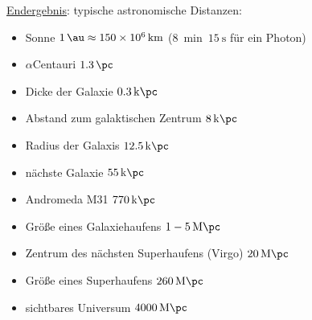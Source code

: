 \underline{Endergebnis}: typische astronomische Distanzen:
\begin{itemize}[label={}]
	\item Sonne $\SI{1}{\au}\approx \SI{150e6}{\km}$ ($\SI{8}{\min}\ \SI{15}{\s}$ für ein Photon)
	\item $\alpha$Centauri $\SI{1.3}{\pc}$
	\item Dicke der Galaxie $\SI{0.3}{k\pc}$
	\item Abstand zum galaktischen Zentrum $\SI{8}{k\pc}$
	\item Radius der Galaxis $\SI{12.5}{k\pc}$
	\item nächste Galaxie $\SI{55}{k\pc}$
	\item Andromeda M31 $\SI{770}{k\pc}$
	\item Größe eines Galaxiehaufens $\num{1}-\SI{5}{M\pc}$
	\item Zentrum des nächsten Superhaufens (Virgo) $\SI{20}{M\pc}$
	\item Größe eines Superhaufens $\SI{260}{M\pc}$
	\item sichtbares Universum $\SI{4000}{M\pc}$
\end{itemize}
